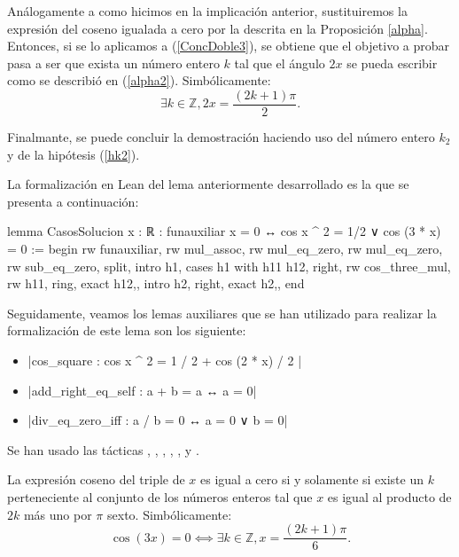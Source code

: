 \begin{demostracion}
    Análogamente a como hicimos en la implicación anterior,
    sustituiremos la expresión del coseno igualada a cero por la
    descrita en la Proposición \ref{alpha}. Entonces, si se lo
    aplicamos a (\ref{ConcDoble3}), se obtiene que el objetivo
    a probar pasa a ser que exista un número entero \(k\) tal que
    el ángulo \(2x\) se pueda escribir como se describió en
    (\ref{alpha2}). Simbólicamente:
    \begin{equation}
      ∃k∈ ℤ, 2x=\frac{(2k+1)π}{2}.
    \end{equation}

    Finalmante, se puede concluir la demostración haciendo uso del
    número entero \(k_2\) y de la hipótesis (\ref{hk2}).
    \end{demostracion}

La formalización en Lean del lema anteriormente desarrollado es
la que se presenta a continuación:
\begin{leancode}
lemma CasosSolucion
  {x : ℝ}
  : funauxiliar x = 0 ↔ cos x ^ 2 = 1/2 ∨ cos (3 * x) = 0 :=
begin
  rw funauxiliar,
  rw mul_assoc,
  rw mul_eq_zero,
  rw mul_eq_zero,
  rw sub_eq_zero,
  split,
  { intro h1,
    cases h1 with h11 h12,
    right,
    rw cos_three_mul,
    rw h11,
    ring,
    exact h12,},
  { intro h2,
    right,
    exact h2,},
end
\end{leancode}


Seguidamente, veamos los lemas auxiliares que se han utilizado
para realizar la formalización de este lema son los siguiente:
\begin{itemize}
\item {}|cos_square : cos x ^ 2 = 1 / 2 + cos (2 * x) / 2 |
\item {}|add_right_eq_self : a + b = a ↔ a = 0|
\item {}|div_eq_zero_iff : a / b = 0 ↔ a = 0 ∨ b = 0|
\end{itemize}
Se han usado las tácticas
,
,
,
,
,
 y
.

\begin{lema}[SolucionCosenoTriple]\label{lemaCosenoTriple}
  La expresión coseno del triple de \(x\) es igual a cero si y solamente
  si existe un \(k\) perteneciente al conjunto de los números enteros
  tal que \(x\) es igual al producto de \(2k\) más uno por \(π\)
  sexto. Simbólicamente:
  \begin{equation}\label{problemaTriple}
    \cos(3x) = 0 ⟺ ∃ k ∈ ℤ, x = \frac{(2k+1)π}{6}.
  \end{equation}
\end{lema}

